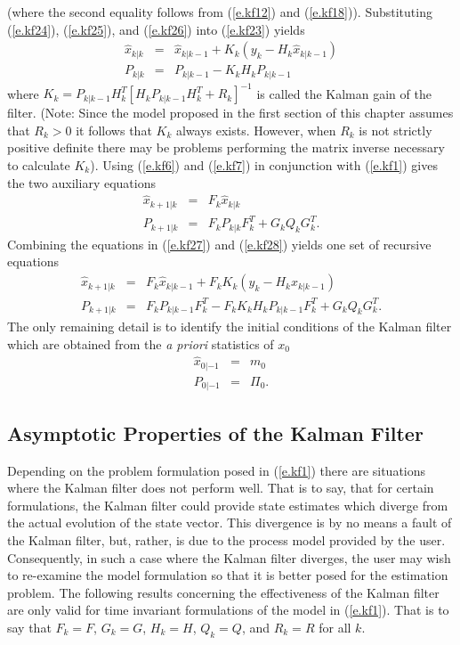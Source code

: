 %
(where the second equality follows from (\ref{e.kf12}) and
(\ref{e.kf18})).  Substituting (\ref{e.kf24}),
(\ref{e.kf25}), and (\ref{e.kf26}) into (\ref{e.kf23}) yields
%
\begin{eqnarray}
\hat{x}_{k|k}&=&\hat{x}_{k|k-1}+K_k(y_k-H_k\hat{x}_{k|k-1})\nonumber\\
P_{k|k}&=&P_{k|k-1}-K_kH_kP_{k|k-1}
\label{e.kf27}
\end{eqnarray}
%
where $K_k=P_{k|k-1}H_k^T[H_kP_{k|k-1}H_k^T+R_k]^{-1}$ is called the 
Kalman gain of the filter.  (Note: Since the model proposed in
the first section of this chapter assumes that $R_k>0$ it follows that
$K_k$ always exists.  However, when $R_k$ is not strictly
positive definite there may be problems performing
the matrix inverse necessary to calculate $K_k$).
Using (\ref{e.kf6}) and (\ref{e.kf7}) in conjunction with (\ref{e.kf1})
gives the two auxiliary equations
%
\begin{eqnarray}
\hat{x}_{k+1|k}&=&F_k\hat{x}_{k|k}\nonumber\\
P_{k+1|k}&=&F_kP_{k|k}F_k^T+G_kQ_kG_k^T.
\label{e.kf28}
\end{eqnarray}
%
Combining the equations in (\ref{e.kf27}) and (\ref{e.kf28}) yields 
one set of recursive equations
%
\begin{eqnarray}
\hat{x}_{k+1|k}&=&F_k\hat{x}_{k|k-1}+F_kK_k(y_k-H_k\hat{x}_{k|k-1})\nonumber\\
P_{k+1|k}&=&F_kP_{k|k-1}F_k^T-F_kK_kH_kP_{k|k-1}F_k^T+G_kQ_kG_k^T.
\label{e.kf29}
\end{eqnarray}
%
The only remaining detail is to identify the initial conditions
of the Kalman filter which are obtained from the {\it a priori}
statistics of $x_0$
%
\begin{eqnarray}
\hat{x}_{0|-1}&=&m_0\nonumber\\
P_{0|-1}&=&\Pi_0.
\label{e.kf30}
\end{eqnarray}
%
\subsection{Asymptotic Properties of the Kalman Filter}

	Depending on the problem formulation posed
in (\ref{e.kf1}) there are situations where the Kalman filter
does not perform well.  That is to say, that for
certain formulations, the Kalman filter could provide
state estimates which diverge from the actual evolution
of the state vector.  This divergence is by no
means a fault of the Kalman filter, but, rather,
is due to the process model provided by the user.
Consequently, in such a case where the Kalman filter
diverges, the user may wish to re-examine the
model formulation so that it
is better posed for the estimation problem.
The following results concerning the effectiveness of
the Kalman filter are only valid for time invariant
formulations of the model in (\ref{e.kf1}).  That is to say
that $F_k=F$, $G_k=G$, $H_k=H$, $Q_k=Q$, and $R_k=R$ for all $k$.

